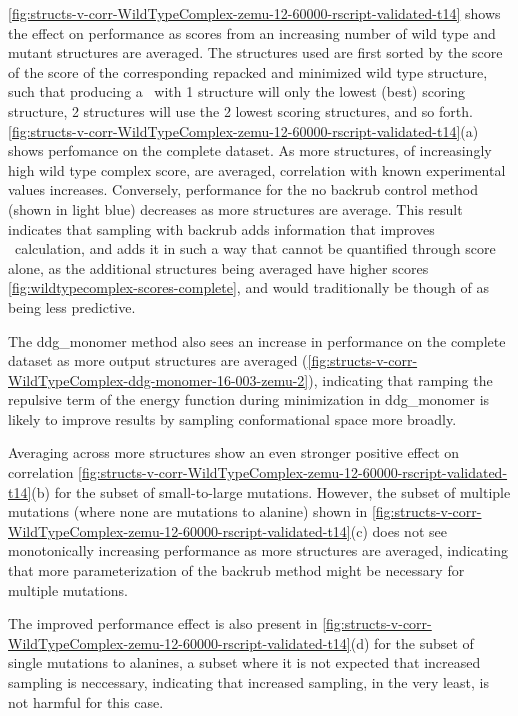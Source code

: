 \cref{fig:structs-v-corr-WildTypeComplex-zemu-12-60000-rscript-validated-t14} shows the effect on performance as scores from an increasing number of wild type and mutant structures are averaged.
The structures used are first sorted by the score of the score of the corresponding repacked and minimized wild type structure, such that producing a \ddg\ with 1 structure will only the lowest (best) scoring structure, 2 structures will use the 2 lowest scoring structures, and so forth.
\cref{fig:structs-v-corr-WildTypeComplex-zemu-12-60000-rscript-validated-t14}(a) shows perfomance on the complete dataset.
As more structures, of increasingly high wild type complex score, are averaged, correlation with known experimental values increases.
Conversely, performance for the no backrub control method (shown in light blue) decreases as more structures are average.
This result indicates that sampling with backrub adds information that improves \ddg\ calculation, and adds it in such a way that cannot be quantified through score alone, as the additional structures being averaged have higher scores \cref{fig:wildtypecomplex-scores-complete}, and would traditionally be though of as being less predictive.

The ddg\_monomer method also sees an increase in performance on the complete dataset as more output structures are averaged (\cref{fig:structs-v-corr-WildTypeComplex-ddg-monomer-16-003-zemu-2}), indicating that ramping the repulsive term of the energy function during minimization in ddg\_monomer is likely to improve results by sampling conformational space more broadly.

Averaging across more structures show an even stronger positive effect on correlation \cref{fig:structs-v-corr-WildTypeComplex-zemu-12-60000-rscript-validated-t14}(b) for the subset of small-to-large mutations.
However, the subset of multiple mutations (where none are mutations to alanine) shown in \cref{fig:structs-v-corr-WildTypeComplex-zemu-12-60000-rscript-validated-t14}(c) does not see monotonically increasing performance as more structures are averaged, indicating that more parameterization of the backrub method might be necessary for multiple mutations.

The improved performance effect is also present in \cref{fig:structs-v-corr-WildTypeComplex-zemu-12-60000-rscript-validated-t14}(d) for the subset of single mutations to alanines, a subset where it is not expected that increased sampling is neccessary, indicating that increased sampling, in the very least, is not harmful for this case.

